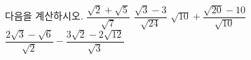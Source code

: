 다음을 계산하시오.
 $\dfrac{\sqrt{2}+\sqrt{5}}{\sqrt{7}}$
 $\dfrac{\sqrt{3}-3}{\sqrt{24}}$
 $\sqrt{10}+\dfrac{\sqrt{20}-10}{\sqrt{10}}$
 $\dfrac{2\sqrt{3}-\sqrt{6}}{\sqrt{2}}-\dfrac{3\sqrt{2}-2\sqrt{12}}{\sqrt{3}}$
